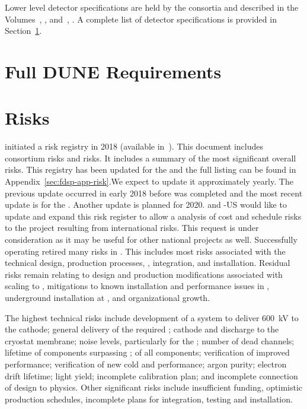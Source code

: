 Lower level detector specifications are held by the consortia and
described in the   
Volumes~\volnumbersp{}, \voltitlesp{}, and~\volnumberdp{}, \voltitledp{}. A complete list of detector specifications is
provided in Section~\ref{sec:fdsp-app-requirements}.

\section{Full DUNE Requirements}
\label{sec:fdsp-app-requirements}



\section{Risks}
\label{sec:fdsp-coord-risks}

 initiated a risk registry in 2018 (available
in~). This document includes consortium risks and
 risks. It includes a summary of the most significant
overall  risks.  This registry has been updated for the
 and the full listing can be found in
Appendix~\ref{sec:fdsp-app-risk}.We  expect to update it
approximately yearly. The previous update occurred in early 2018
before  was completed and the most recent update is for the
. Another update is planned for 2020. %
 and
-US would like  to update and expand this risk
register to allow a  analysis of cost and schedule risks to
the  project resulting from international 
risks. This request is under consideration as it may be useful for
other national projects as well.  Successfully operating
 retired many  risks in
. This includes most risks associated with the technical
design, production processes, , integration, and
installation. Residual risks remain relating to design and production
modifications associated with scaling to , mitigations to
known installation and performance issues in ,
underground installation at , and organizational growth.

The highest technical risks include development of a system to
deliver \SI{600}{kV} to the  cathode; general delivery of the
required ; cathode and  discharge to the cryostat
membrane; noise levels, particularly for the ; 
number of dead channels; lifetime of components surpassing \dunelifetime{}; 
 of all components; verification of improved 
performance; verification of new cold   and   performance;
argon purity; electron drift lifetime; \phel light yield;
incomplete calibration plan; and incomplete connection of design to
physics. Other significant risks include insufficient funding, optimistic
production schedules, incomplete plans for integration, testing and installation. 


